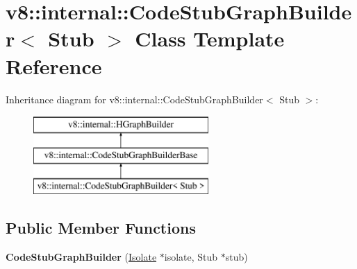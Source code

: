 \hypertarget{classv8_1_1internal_1_1_code_stub_graph_builder}{}\section{v8\+:\+:internal\+:\+:Code\+Stub\+Graph\+Builder$<$ Stub $>$ Class Template Reference}
\label{classv8_1_1internal_1_1_code_stub_graph_builder}
Inheritance diagram for v8\+:\+:internal\+:\+:Code\+Stub\+Graph\+Builder$<$ Stub $>$\+:\begin{figure}[H]
\begin{center}
\leavevmode
\includegraphics[height=3.000000cm]{classv8_1_1internal_1_1_code_stub_graph_builder}
\end{center}
\end{figure}
\subsection*{Public Member Functions}
\begin{DoxyCompactItemize}
\item 
\hypertarget{classv8_1_1internal_1_1_code_stub_graph_builder_afc27e8f47bb0c5994bc1c0d113be4dcb}{}{\bfseries Code\+Stub\+Graph\+Builder} (\hyperlink{classv8_1_1internal_1_1_isolate}{Isolate} $\ast$isolate, Stub $\ast$stub)\label{classv8_1_1internal_1_1_code_stub_graph_builder_afc27e8f47bb0c5994bc1c0d113be4dcb}

\end{DoxyCompactItemize}
